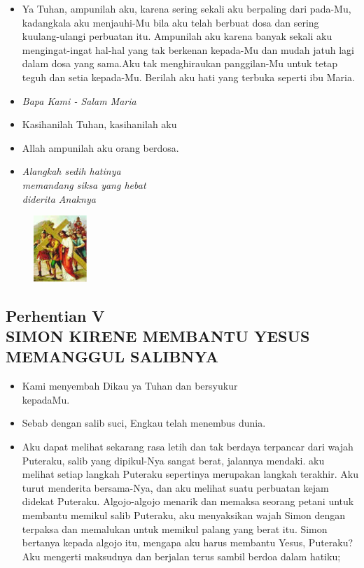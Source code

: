 \documentclass[a5paper,headsepline,titlepage,10pt,nnormalheadings,DIVcalc]{scrbook}
\newcommand{\BU}[1]{\begin{itemize} \item[U:] #1 \end{itemize}}
\newcommand{\BP}[1]{\begin{itemize} \item[P:] #1 \end{itemize}}
\begin{document}
\BU{Ya Tuhan, ampunilah aku, karena sering sekali aku berpaling dari pada-Mu, kadangkala aku menjauhi-Mu bila aku telah berbuat dosa dan sering kuulang-ulangi perbuatan itu. Ampunilah aku karena banyak sekali aku mengingat-ingat hal-hal yang tak berkenan kepada-Mu dan mudah jatuh lagi dalam dosa yang sama.Aku tak menghiraukan panggilan-Mu untuk tetap teguh dan setia kepada-Mu. Berilah aku hati yang terbuka seperti ibu Maria.}

\large\begin{itemize}\item[~]\it{Bapa Kami - Salam Maria}\end{itemize}\normalsize
\BP{Kasihanilah Tuhan, kasihanilah aku}
   \BU{Allah ampunilah aku orang berdosa.}

\begin{itemize}
\item[4.] \it{Alangkah sedih hatinya\\ memandang siksa
    yang hebat\\ diderita Anaknya
}\end{itemize}

\begin{figure}
\includegraphics[width=2cm]{jalansalib_files/05_small.jpg}
\end{figure}
\subsection*{Perhentian V\\
SIMON KIRENE MEMBANTU YESUS\\MEMANGGUL SALIBNYA}

\BP{   Kami menyembah Dikau ya Tuhan dan bersyukur\\kepadaMu.}
\BU{   Sebab dengan salib suci, Engkau telah menembus dunia.}

\BP{ Aku  dapat   melihat  sekarang  rasa  letih  dan  tak  berdaya  terpancar dari wajah Puteraku, salib yang  dipikul-Nya sangat berat, jalannya mendaki. aku melihat setiap langkah Puteraku sepertinya merupakan langkah terakhir. Aku turut menderita bersama-Nya, dan aku melihat suatu perbuatan kejam didekat Puteraku. Algojo-algojo menarik dan memaksa seorang petani untuk membantu memikul salib Puteraku, aku menyaksikan wajah Simon dengan terpaksa dan memalukan untuk memikul palang yang berat itu. Simon bertanya kepada algojo itu, mengapa aku harus membantu Yesus, Puteraku? Aku mengerti maksudnya dan berjalan terus sambil berdoa dalam hatiku;}
\end{document}
